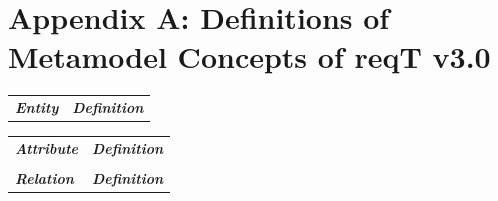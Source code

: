 \documentclass[a4paper]{llncs}
\begin{document}



\clearpage
\section*{Appendix A: Definitions of Metamodel Concepts of reqT v3.0}
\begin{minipage}{1\linewidth}
\begin{minipage}{0.30\textwidth} 

\begin{table}[H]
\vspace{-1.0cm}
\fontsize{6}{6.5}\selectfont

\begin{tabular}{l p{4.6cm}}

\textbf{\textit{Entity}} & \textbf{\textit{Definition}}  \\

 \end{tabular}
\end{table}
\end{minipage}
 \hspace{4em plus 1fill} 
\begin{minipage}{0.46\textwidth} 
 \begin{table}[H]
\fontsize{6}{6.5}\selectfont
\vspace{-1.0cm}
\label{table-entities}
\begin{tabular}{|l p{4.1cm}}
 
\textbf{\textit{Attribute}} & \textbf{\textit{Definition}}  \\ 

 & \\
 \textbf{\textit{Relation}} & \textbf{\textit{Definition}}  \\ 


\end{tabular}
\end{table}

\end{minipage}
\end{minipage}
\end{document}

